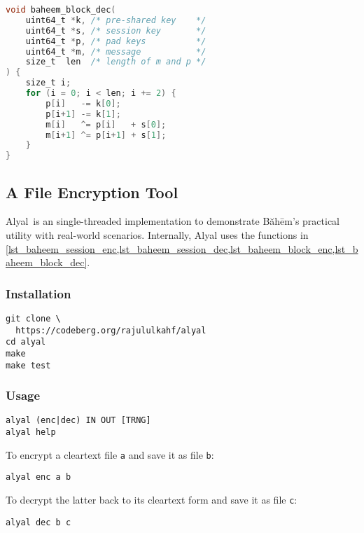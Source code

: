 \documentclass[twocolumn,hidelinks]{article}
\newcommand{\baheem}{Băhēm}
\newcommand{\alyal}{Alyal}
\begin{document}
\begin{lstlisting}[language=C, caption=Block decryption function example.,
                   label=lst_baheem_block_dec]
void baheem_block_dec(
    uint64_t *k, /* pre-shared key    */
    uint64_t *s, /* session key       */
    uint64_t *p, /* pad keys          */
    uint64_t *m, /* message           */
    size_t  len  /* length of m and p */
) {
    size_t i;
    for (i = 0; i < len; i += 2) {
        p[i]   -= k[0];
        p[i+1] -= k[1];
        m[i]   ^= p[i]   + s[0];
        m[i+1] ^= p[i+1] + s[1];
    }
}
\end{lstlisting}

\subsection{A File Encryption Tool}
\alyal\ is an single-threaded implementation to demonstrate \baheem's
practical utility with real-world scenarios.  Internally, Alyal uses the
functions in
\cref{lst_baheem_session_enc,lst_baheem_session_dec,lst_baheem_block_enc,lst_baheem_block_dec}.

\subsubsection{Installation}
\begin{verbatim}
git clone \
  https://codeberg.org/rajululkahf/alyal
cd alyal
make
make test
\end{verbatim}

\subsubsection{Usage}

\begin{verbatim}
alyal (enc|dec) IN OUT [TRNG]
alyal help
\end{verbatim}

To encrypt a cleartext file \texttt{a} and save it as file \texttt{b}:
\begin{verbatim}
alyal enc a b
\end{verbatim}

To decrypt the latter back to its cleartext form and save it as file
\texttt{c}:
\begin{verbatim}
alyal dec b c
\end{verbatim}
\end{document}
